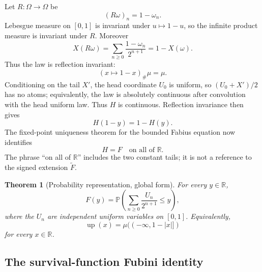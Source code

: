 \documentclass[11pt,oneside]{article}
\newtheorem{theorem}{Theorem}[section]
\theoremstyle{definition}
\theoremstyle{remark}
\newcommand{\R}{\mathbb R}
\newcommand{\Up}{\operatorname{up}}
\newcommand{\Prob}{\mathbb P}
\begin{document}
Let $R:\Omega\to\Omega$ be
\begin{equation}
 (R\omega)_n=1-\omega_n.
 \label{integration:eq:coordinate-reflection}
\end{equation}
Lebesgue measure on $[0,1]$ is invariant under $u\mapsto1-u$, so the infinite product measure
is invariant under $R$.  Moreover
\begin{equation}
 X(R\omega)=\sum_{n\ge0}\frac{1-\omega_n}{2^{n+1}}
 =1-X(\omega).
 \label{integration:eq:X-reflection}
\end{equation}
Thus the law is reflection invariant:
\begin{equation}
 (x\mapsto1-x)_\#\mu=\mu.
 \label{integration:eq:law-reflection}
\end{equation}
Conditioning on the tail \(X'\), the head coordinate \(U_0\) is uniform, so
\((U_0+X')/2\) has no atoms; equivalently, the law is absolutely continuous after
convolution with the head uniform law.  Thus \(H\) is continuous.  Reflection invariance
then gives
\begin{equation}
 H(1-y)=1-H(y).
 \label{integration:eq:CDF-reflection}
\end{equation}
The fixed-point uniqueness theorem for the bounded Fabius equation now identifies
\begin{equation}
 H=F
 \quad\text{on all of }\R.
 \label{integration:eq:CDF-is-F}
\end{equation}
The phrase ``on all of $\R$'' includes the two constant tails; it is not a reference to the
signed extension $\widetilde F$.

\begin{theorem}[Probability representation, global form]
\label{integration:thm:probability-representation-global}
For every $y\in\R$,
\begin{equation}
 F(y)=\Prob\!\left(\sum_{n\ge0}\frac{U_n}{2^{n+1}}\le y\right),
 \label{integration:eq:F-as-CDF-global}
\end{equation}
where the $U_n$ are independent uniform variables on $[0,1]$.  Equivalently,
\begin{equation}
 \Up(x)=\mu(({-\infty},1-|x|])
 \label{integration:eq:up-as-CDF-global}
\end{equation}
for every $x\in\R$.
\end{theorem}

\subsection{The survival-function Fubini identity}
\label{integration:sec:survival-fubini}
\end{document}
